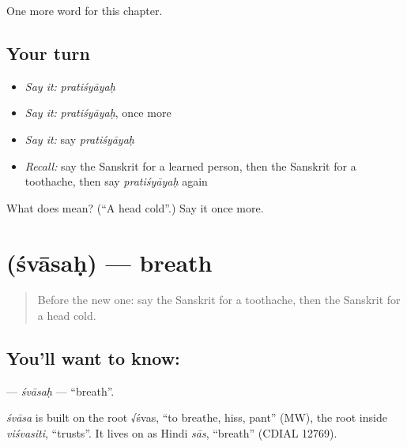 \begin{grammarlens}[title={What you've built}]
One more word for this chapter.
\end{grammarlens}

\subsection*{Your turn}
\begin{itemize}
\raggedright
  \item \emph{Say it:} \emph{pratiśyāyaḥ}
  \item \emph{Say it:} \emph{pratiśyāyaḥ}, once more
  \item \emph{Say it:} say \emph{pratiśyāyaḥ}
  \item \emph{Recall:} say the Sanskrit for a learned person, then the Sanskrit for a toothache, then say \emph{pratiśyāyaḥ} again
\end{itemize}

\begin{tcolorbox}[breakable,colback=teal!4,colframe=teal!35!black,title={Before you move on}]
What does  mean? (\textquotedblleft{}A head cold\textquotedblright{}.) Say it once more.
\end{tcolorbox}
\section[\texorpdfstring{\sk{श्वासः} (śvāsaḥ)}{श्वासः (śvāsaḥ)}]{ (śvāsaḥ) — breath}

\label{lesson:SA-C181-svasah}



\begin{quote}
Before the new one: say the Sanskrit for a toothache, then the Sanskrit for a head cold.
\end{quote}

\subsection*{You'll want to know: }
\textbf{} — \emph{śvāsaḥ} — \textquotedblleft{}breath\textquotedblright{}.

\begin{cousinweb}
\emph{śvāsa} is built on the root √śvas, \textquotedblleft{}to breathe, hiss, pant\textquotedblright{} (MW), the root inside \emph{viśvasiti}, \textquotedblleft{}trusts\textquotedblright{}. It lives on as Hindi \emph{sās}, \textquotedblleft{}breath\textquotedblright{} (CDIAL 12769).
\end{cousinweb}

